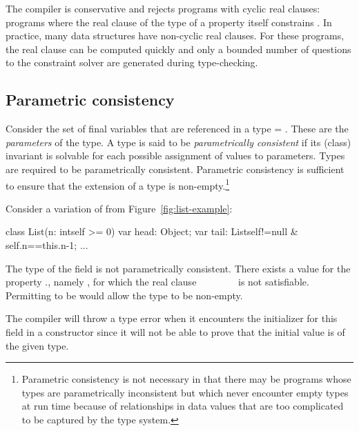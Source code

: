The \Xten{} compiler is conservative and rejects
programs with cyclic real clauses: programs where the real
clause of the type
of a property  itself constrains .
%
%
In practice, many data structures have non-cyclic real clauses.
For these programs, the real clause can be computed quickly and
only a bounded number of questions to the constraint solver are
generated during type-checking.


\subsection{Parametric consistency}

Consider the set of final variables that are referenced in a type
 = . These are the {\em parameters} of the type. A
type is said to be {\em parametrically consistent} if its
(class)
invariant
 is solvable for each possible assignment of values to
parameters.  Types are required to be parametrically
consistent. Parametric consistency is sufficient to ensure that the
extension of a type is non-empty.\footnote{Parametric
consistency is not necessary in that
there may be programs whose types are parametrically inconsistent
but which never encounter empty types at run time because of
relationships in data values that are too complicated to be captured by
the type system.}

Consider a variation of  from Figure~\ref{fig:list-example}:
\begin{xten}
class List(n: int{self >= 0}) {
  var head: Object;
  var tail: List{self!=null &
                 self.n==this.n-1};
  ...
}
\end{xten}
The type of the field  is not parametrically
consistent. There exists a value for the property ., namely
, for which the real clause ~\xcd{!=}~ \xcd{&}
~\xcd{==}~ \xcd{&}
~\xcd{>=}~ is not satisfiable.  Permitting
 to be  would allow the type to be non-empty.

The compiler will throw a type error when it encounters the
initializer for this field in a constructor since it will not be able
to prove that the initial value is of the given type.


